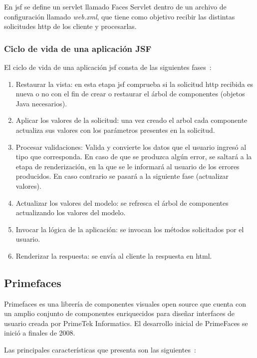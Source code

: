 En \acrshort{jsf} se define un servlet llamado Faces Servlet dentro de un archivo de configuración llamado \textit{web.xml}, que tiene como objetivo recibir las distintas solicitudes \acrshort{http} de los cliente y procesarlas. 

\subsubsection{Ciclo de vida de una aplicación JSF}
\label{sec:ciclo-vida-jsf}
El ciclo de vida de una aplicación \acrshort{jsf} consta de las siguientes fases~\cite{DesarrolloJakartaEE}:

\begin{enumerate}
\item Restaurar la vista: en esta etapa \acrshort{jsf} comprueba si la solicitud \acrshort{http} recibida es nueva o no con el fin de crear o restaurar el árbol de componentes (objetos Java necesarios).
\item Aplicar los valores de la solicitud: una vez creado el arbol cada componente actualiza sus valores con los parámetros presentes en la solicitud.
\item Procesar validaciones: Valida y convierte los datos que el usuario ingresó al tipo que corresponda. En caso de que se produzca algún error, se saltará a la etapa de renderización, en la que se le informará al usuario de los errores producidos. En caso contrario se pasará a la siguiente fase (actualizar valores).
\item Actualizar los valores del modelo: se refresca el árbol de componentes actualizando los valores del modelo.
\item Invocar la lógica de la aplicación: se invocan los métodos solicitados por el usuario.
\item Renderizar la respuesta: se envía al cliente la respuesta en \acrshort{html}.
\end{enumerate}


\subsection{Primefaces}
\label{sec:primefaces}

Primefaces es una librería de componentes visuales open source que cuenta con un amplio conjunto de componentes enriquecidos para diseñar interfaces de usuario creada por PrimeTek Informatics. El desarrollo inicial de PrimeFaces se inició a finales de 2008\cite{WikiPrimefaces}.

Las principales características que presenta son las siguientes~\cite{Primefaces}:

